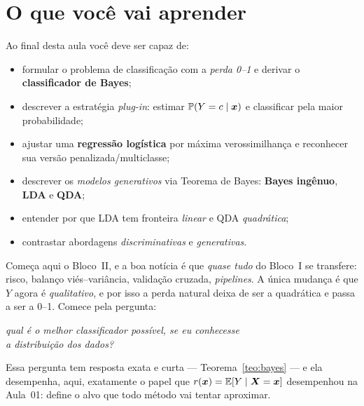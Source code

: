 \documentclass[11pt,a4paper]{article}
\title{}
\date{}
\begin{document}

\section*{O que você vai aprender}
Ao final desta aula você deve ser capaz de:
\begin{itemize}[leftmargin=1.4cm]
  \item formular o problema de classificação com a \emph{perda 0--1} e derivar o
        \textbf{classificador de Bayes};
  \item descrever a estratégia \emph{plug-in}: estimar $\mathbb{P}(Y=c\mid\bm{x})$ e
        classificar pela maior probabilidade;
  \item ajustar uma \textbf{regressão logística} por máxima verossimilhança e
        reconhecer sua versão penalizada/multiclasse;
  \item descrever os \emph{modelos generativos} via Teorema de Bayes: \textbf{Bayes
        ingênuo}, \textbf{LDA} e \textbf{QDA};
  \item entender por que LDA tem fronteira \emph{linear} e QDA \emph{quadrática};
  \item contrastar abordagens \emph{discriminativas} e \emph{generativas}.
\end{itemize}

\noindent
Começa aqui o Bloco~II, e a boa notícia é que \emph{quase tudo} do Bloco~I se
transfere: risco, balanço viés--variância, validação cruzada, \emph{pipelines}. A
única mudança é que $Y$ agora é \emph{qualitativo}, e por isso a perda natural
deixa de ser a quadrática e passa a ser a 0--1. Comece pela pergunta:

\begin{center}\itshape
  qual é o melhor classificador possível, se eu conhecesse\\
  a distribuição dos dados?
\end{center}

\noindent
Essa pergunta tem resposta exata e curta --- Teorema~\ref{teo:bayes} --- e ela
desempenha, aqui, exatamente o papel que $r(\bm{x})=\mathbb{E}[Y\mid\bm{X}=\bm{x}]$ desempenhou na
Aula~01: define o alvo que todo método vai tentar aproximar.

\end{document}
